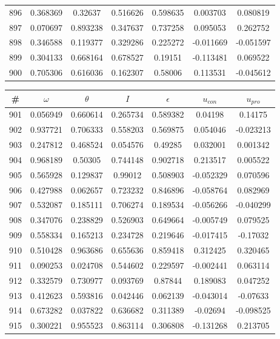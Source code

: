\begin{table}
\begin{tabular}{c|c|c|c|c|c|c}
896 & 0.368369 & 0.32637 & 0.516626 & 0.598635 & 0.003703 & 0.080819\\
897 & 0.070697 & 0.893238 & 0.347637 & 0.737258 & 0.095053 & 0.262752\\
898 & 0.346588 & 0.119377 & 0.329286 & 0.225272 & -0.011669 & -0.051597\\
899 & 0.304133 & 0.668164 & 0.678527 & 0.19151 & -0.113481 & 0.069522\\
900 & 0.705306 & 0.616036 & 0.162307 & 0.58006 & 0.113531 & -0.045612\\
\end{tabular}
\end{table}
\newpage
\begin{table}
\begin{tabular}{c|c|c|c|c|c|c}
\# & $\omega$ & $\theta$ & $I$ & $\epsilon$ & $u_{con}$ & $u_{pro}$\\
\hline
901 & 0.056949 & 0.660614 & 0.265734 & 0.589382 & 0.04198 & 0.14175\\
902 & 0.937721 & 0.706333 & 0.558203 & 0.569875 & 0.054046 & -0.023213\\
903 & 0.247812 & 0.468524 & 0.054576 & 0.49285 & 0.032001 & 0.001342\\
904 & 0.968189 & 0.50305 & 0.744148 & 0.902718 & 0.213517 & 0.005522\\
905 & 0.565928 & 0.129837 & 0.99012 & 0.508903 & -0.052329 & 0.070596\\
906 & 0.427988 & 0.062657 & 0.723232 & 0.846896 & -0.058764 & 0.082969\\
907 & 0.532087 & 0.185111 & 0.706274 & 0.189534 & -0.056266 & -0.040299\\
908 & 0.347076 & 0.238829 & 0.526903 & 0.649664 & -0.005749 & 0.079525\\
909 & 0.558334 & 0.165213 & 0.234728 & 0.219646 & -0.017415 & -0.17032\\
910 & 0.510428 & 0.963686 & 0.655636 & 0.859418 & 0.312425 & 0.320465\\
911 & 0.090253 & 0.024708 & 0.544602 & 0.229597 & -0.002441 & 0.063114\\
912 & 0.332579 & 0.730977 & 0.093769 & 0.87844 & 0.189083 & 0.047252\\
913 & 0.412623 & 0.593816 & 0.042446 & 0.062139 & -0.043014 & -0.07633\\
914 & 0.673282 & 0.037822 & 0.636682 & 0.311389 & -0.02694 & -0.098525\\
915 & 0.300221 & 0.955523 & 0.863114 & 0.306808 & -0.131268 & 0.213705\\

\end{tabular}
\end{table}
